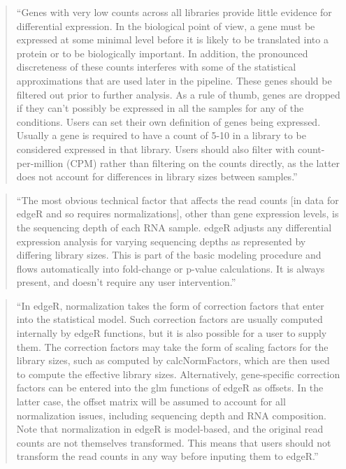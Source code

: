\documentclass[]{tufte-book}
\begin{document}
\begin{quote}
``Genes with very low counts across all libraries provide little evidence for
differential expression. In the biological point of view, a gene must be
expressed at some minimal level before it is likely to be translated into a
protein or to be biologically important. In addition, the pronounced
discreteness of these counts interferes with some of the statistical
approximations that are used later in the pipeline. These genes should be
filtered out prior to further analysis. As a rule of thumb, genes are dropped if
they can't possibly be expressed in all the samples for any of the conditions.
Users can set their own definition of genes being expressed. Usually a gene is
required to have a count of 5-10 in a library to be considered expressed in that
library. Users should also filter with count-per-million (CPM) rather than
filtering on the counts directly, as the latter does not account for differences
in library sizes between samples.'' \citep{chen2014edger}
\end{quote}

\begin{quote}
``The most obvious technical factor that affects the read counts {[}in data for
edgeR and so requires normalizations{]}, other than gene expression levels, is the
sequencing depth of each RNA sample. edgeR adjusts any differential expression
analysis for varying sequencing depths as represented by differing library
sizes. This is part of the basic modeling procedure and flows automatically into
fold-change or p-value calculations. It is always present, and doesn't require
any user intervention.'' \citep{chen2014edger}
\end{quote}

\begin{quote}
``In edgeR, normalization takes the form of correction factors that enter into
the statistical model. Such correction factors are usually computed internally
by edgeR functions, but it is also possible for a user to supply them. The
correction factors may take the form of scaling factors for the library sizes,
such as computed by calcNormFactors, which are then used to compute the
effective library sizes. Alternatively, gene-specific correction factors can be
entered into the glm functions of edgeR as offsets. In the latter case, the
offset matrix will be assumed to account for all normalization issues, including
sequencing depth and RNA composition. Note that normalization in edgeR is
model-based, and the original read counts are not themselves transformed. This
means that users should not transform the read counts in any way before inputing
them to edgeR.'' \citep{chen2014edger}
\end{quote}
\end{document}
